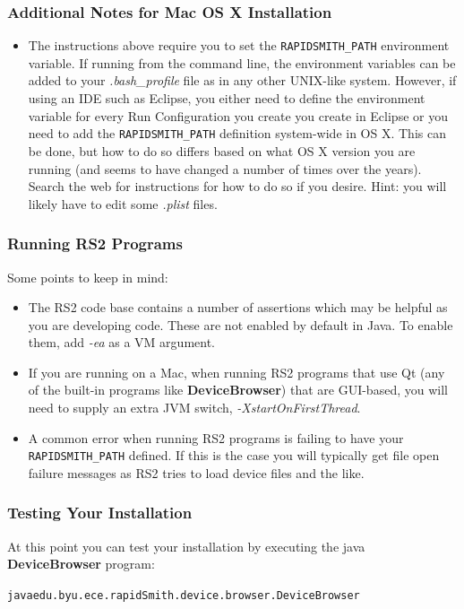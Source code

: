\documentclass[12pt]{article}
\newcommand{\env}[1]{{\texttt{#1}}}
\newcommand{\fil}[1]{{\em #1}}
\newcommand{\opt}[1]{{\em #1}}
\newcommand{\pgm}[1]{{\textbf{#1}}}
\newenvironment{code}{\begin{center} \begin{minipage}{6in} \noindent \begin{alltt}}{\end{alltt} \end{minipage} \end{center}}
\begin{document}
\subsubsection{Additional Notes for Mac OS X Installation}
\begin{itemize}
  \item The instructions above require you to set the \env{RAPIDSMITH\_PATH}
  environment variable.  If running from the command line, the environment
  variables can be added to your \fil{.bash\_profile} file as in any other
  UNIX-like system.  However, if using an IDE such as Eclipse, you either need to define
  the environment variable for every Run Configuration you create you create in
  Eclipse or you need to add the \env{RAPIDSMITH\_PATH} definition system-wide
  in OS X.
  This can be done, but how to do so differs based on what OS X version you are
  running (and seems to have changed a number of times over the years).  Search
  the web for instructions for how to do so if you desire.   Hint: you will
  likely have to edit some \fil{.plist} files.
\end{itemize}

\subsubsection{Running RS2 Programs}
Some points to keep in mind:
\begin{itemize}
  \item The RS2 code base contains a number of assertions which may be helpful  
  as you are developing code.  These are not enabled by default in Java.  To
  enable them, add \opt{-ea} as a VM argument.
  \item If you are running on a Mac, when running RS2 programs that use Qt  (any
  of the built-in programs like \pgm{DeviceBrowser}) that are GUI-based, you
  will need to supply an extra JVM switch, \opt{-XstartOnFirstThread}.
  \item A common error when running RS2 programs is failing to have your
  \env{RAPIDSMITH\_PATH} defined.  If this is the case you will typically get
  file open failure messages as RS2 tries to load device files and the like.
\end{itemize}

\subsubsection{Testing Your Installation}

At this point you can test your installation by executing the java
\pgm{DeviceBrowser} program: 
\vspace{-0.15in}  \begin{code}
java edu.byu.ece.rapidSmith.device.browser.DeviceBrowser
\end{code}    
\end{document}
